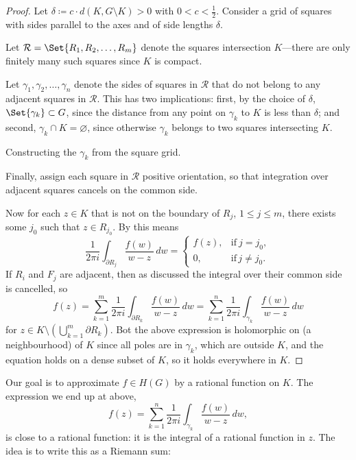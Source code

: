 \begin{proof}
	Let $\delta \coloneqq c \cdot d(K, G\setminus K) > 0$ with $0 < c < \frac{1}{2}$.
	Consider a grid of squares with sides parallel to the axes and of side lengths $\delta$.

	Let $\mathcal{R} = \Set{R_1, R_2, \dots, R_m}$ denote the squares intersection $K$---there are only finitely many such squares since $K$ is compact.

	Let $\gamma_1, \gamma_2, \dots, \gamma_n$ denote the sides of squares in $\mathcal{R}$ that do not belong to any adjacent squares in $\mathcal{R}$.
	This has two implications: first, by the choice of $\delta$, $\Set{\gamma_k} \subset G$, since the distance from any point on $\gamma_k$ to $K$ is less than $\delta$; and second, $\gamma_k \cap K = \varnothing$, since otherwise $\gamma_k$ belongs to two squares intersecting $K$.

	\begin{marginfigure}

		\caption{\label{prop101:figb} Constructing the $\gamma_k$ from the square grid.}
	\end{marginfigure}

	Finally, assign each square in $\mathcal{R}$ positive orientation, so that integration over adjacent squares cancels on the common side.

	Now for each $z \in K$ that is not on the boundary of $R_j$, $1 \leq j \leq m$, there exists some $j_0$ such that $z \in R_{j_0}$.
	By  this means
	\[
		\frac{1}{2 \pi i} \int_{\partial R_j} \frac{f(w)}{w - z} \, d w = \begin{cases}
			f(z), & \text{if}\ j = j_0, \\
			0, & \text{if}\, j \neq j_0.
		\end{cases}
	\]
	If $R_i$ and $F_j$ are adjacent, then as discussed the integral over their common side is cancelled, so
	\[
		f(z) = \sum_{k = 1}^m \frac{1}{2 \pi i} \int_{\partial R_k} \frac{f(w)}{w - z} \, d w = \sum_{k = 1}^n \frac{1}{2 \pi i} \int_{\gamma_k} \frac{f(w)}{w - z} \, d w
	\]
	for $z \in K \setminus ( \bigcup\limits_{k = 1}^m \partial R_k )$.
	Bot the above expression is holomorphic on (a neighbourhood) of $K$ since all poles are in $\gamma_k$, which are outside $K$, and the equation holds on a dense subset of $K$, so it holds everywhere in $K$.
\end{proof}

Our goal is to approximate $f \in H(G)$ by a rational function on $K$.
The expression we end up at above,
\[
	f(z) = \sum_{k = 1}^n \frac{1}{2 \pi i} \int_{\gamma_k} \frac{f(w)}{w - z} \, d w,
\]
is close to a rational function: it is the integral of a rational function in $z$.
The idea is to write this as a Riemann sum:


